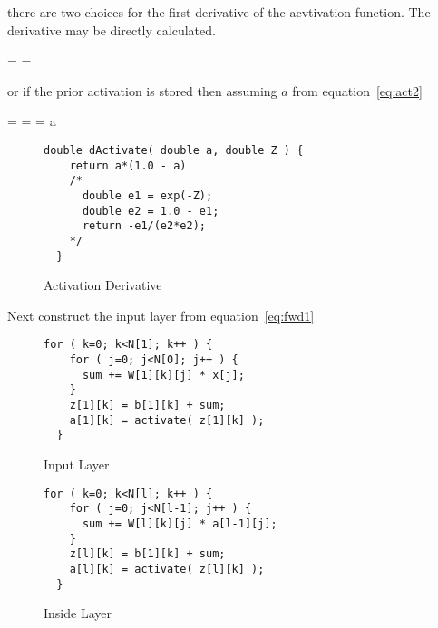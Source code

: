 \documentclass{article}
\begin{document}
there are two choices for the first derivative of the acvtivation function.
The derivative may be directly calculated.

\begin{tcequation}
  \delta =   = 
\end{tcequation}

or if the prior activation is stored then assuming $a$ from equation~\ref{eq:act2}

\begin{tcequation}
  \delta =   =  = a
\end{tcequation}

\begin{figure}[h]
\caption{Activation Derivative\label{eq:Dact2}}
\begin{Verbatim}[frame=single]
  double dActivate( double a, double Z ) {
    return a*(1.0 - a)
    /*
      double e1 = exp(-Z);
      double e2 = 1.0 - e1;
      return -e1/(e2*e2);
    */
  }
\end{Verbatim}
\end{figure}

Next construct the input layer from equation~\ref{eq:fwd1}

\begin{figure}[h]
\caption{Input Layer}
\begin{Verbatim}[frame=single]
  for ( k=0; k<N[1]; k++ ) {
    for ( j=0; j<N[0]; j++ ) {
      sum += W[1][k][j] * x[j];
    }
    z[1][k] = b[1][k] + sum;
    a[1][k] = activate( z[1][k] );
  }
\end{Verbatim}
\end{figure}

\begin{figure}[h]
\caption{Inside Layer}
\begin{Verbatim}[frame=single]
  for ( k=0; k<N[l]; k++ ) {
    for ( j=0; j<N[l-1]; j++ ) {
      sum += W[l][k][j] * a[l-1][j];
    }
    z[l][k] = b[1][k] + sum;
    a[l][k] = activate( z[l][k] );
  }
\end{Verbatim}
\end{figure}
\end{document}
